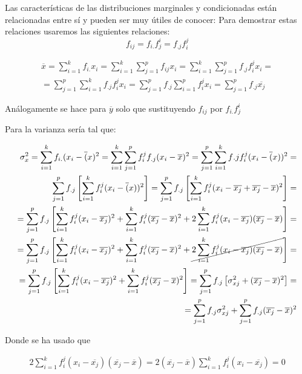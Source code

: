 \documentclass{article}
\begin{document}
	Las características de las distribuciones marginales y condicionadas están relacionadas entre sí y pueden ser muy útiles de conocer:
	Para demostrar estas relaciones usaremos las siguientes relaciones: $$f_{ij} = f_{i.} f_j^i = f_{.j} f_i^j $$
	
	\begin{align*}
	\overline{x} = \sum_{i=1}^k f_{i.} x_i = \sum_{i=1}^{k} \sum_{j=1}^{p} f_{ij} x_i =  \sum_{i=1}^{k} \sum_{j=1}^{p} f_{.j} f_i^j x_i =  \\
	=  \sum_{j=1}^p \sum_{i=1}^k f_{.j}f_i^j x_i = \sum_{j=1}^{p} f_{.j} \sum_{i=1}^{p} f_i^j  x_i = \sum_{j=1}^p f_{.j} \overline{x_j}
	\end{align*}
	
	Análogamente se hace para $\overline{y}$ solo que sustituyendo $f_{ij}$ por 
$f_{i.} f_j^i$
	
	Para la varianza sería tal que:


\begin{align*}
	\sigma_x^2 = \sum_{i=1}^k f_{i.} (x_i - \overline(x)^2 = \sum_{i=1}^k \sum_{j=1}^p f_i^j f_{.j} (x_i -\overline{x})^2 = \sum_{j=1}^p \sum_{i=1}^k f{.j}f_i^j (x_i - \overline(x))^2 = \\
	 \sum_{j=1}^p f_{.j} \left[\sum_{i=1}^k f_i^j (x_i - \overline(x))^2 \right] = \sum_{j=1}^p f_{.j} \left[\sum_{i=1}^k f_i^j (x_i - \overline{x_j} + \overline{x_j} - \overline{x})^2 \right] = \\
	= \sum_{j=1}^p f_{.j} \left[ \sum_{i=1}^k f_i^j(x_i - \overline{x_j})^2 + \sum_{i=1}^k f_i^j (\overline{x_j}-\overline{x})^2 + 2\sum_{i=1}^k f_i^j (x_i - \overline{x_j})(\overline{x_j}-\overline{x})\right] = \\
	= \sum_{j=1}^p f_{.j} \left[ \sum_{i=1}^k f_i^j(x_i - \overline{x_j})^2 + \sum_{i=1}^k f_i^j (\overline{x_j}-\overline{x})^2 + \cancel{2\sum_{i=1}^k f_i^j (x_i - \overline{x_j})(\overline{x_j}-\overline{x})}\right] = \\
	= \sum_{j=1}^p f_{.j} \left[ \sum_{i=1}^k f_i^j(x_i - \overline{x_j})^2 + \sum_{i=1}^k f_i^j (\overline{x_j}-\overline{x})^2 \right ]= \sum_{j=1}^p f_{.j} \left[\sigma_{xj}^2 + (\overline{x_j}-\overline{x})^2\right] = \\
= \sum_{j=1}^p f_{.j} \sigma_{xj}^2 + \sum_{j=1}^p f_{.j} (\overline{x_j} - \overline{x})^2
\end{align*}

\vspace{8cm}


Donde se ha usado que 

\begin{align*}
2\sum_{i=1}^k f_i^j (x_i - \overline{x_j})(\overline{x_j}-\overline{x}) = 2(\overline{x_j}-\overline{x})\sum_{i=1}^k f_i^j(x_i - \overline{x_j}) = 0
\end{align*}
\end{document}
